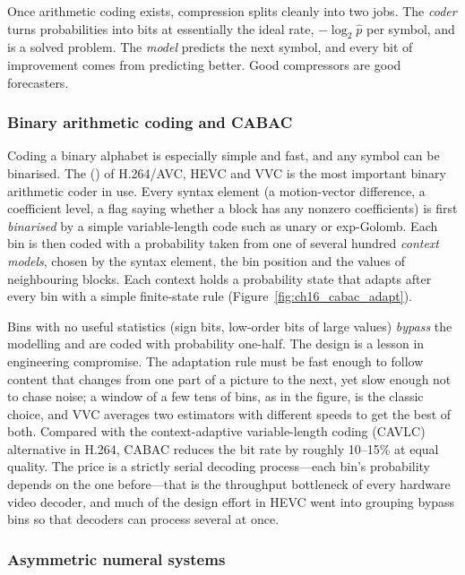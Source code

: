 \begin{keyidea}
Once arithmetic coding exists, compression splits cleanly into two jobs. The \emph{coder} turns
probabilities into bits at essentially the ideal rate, $-\log_2\hat p$ per symbol, and is a solved
problem. The \emph{model} predicts the next symbol, and every bit of improvement comes from
predicting better. Good compressors are good forecasters.
\end{keyidea}

\subsubsection{Binary arithmetic coding and CABAC}

Coding a binary alphabet is especially simple and fast, and any symbol can be binarised. The
 () of H.264/AVC, HEVC and VVC is the
most important binary arithmetic coder in use. Every syntax element (a motion-vector difference, a
coefficient level, a flag saying whether a block has any nonzero coefficients) is first
\emph{binarised} by a simple variable-length code such as unary or exp-Golomb. Each bin is then
coded with a probability taken from one of several hundred \emph{context models}, chosen by the
syntax element, the bin position and the values of neighbouring blocks. Each context holds a
probability state that adapts after every bin with a simple finite-state rule
(Figure~\ref{fig:ch16_cabac_adapt}).

Bins with no useful statistics (sign bits, low-order bits of large values) \emph{bypass} the
modelling and are coded with probability one-half. The design is a lesson in engineering
compromise. The adaptation rule must be fast enough to follow content that changes from one part
of a picture to the next, yet slow enough not to chase noise; a window of a few tens of bins, as in
the figure, is the classic choice, and VVC averages two estimators with different speeds to get the
best of both. Compared with the context-adaptive variable-length coding (CAVLC) alternative in
H.264, CABAC reduces the bit rate by roughly 10--15\% at equal quality. The price is a strictly
serial decoding process---each bin's probability depends on the one before---that is the throughput
bottleneck of every hardware video decoder, and much of the design effort in HEVC went into
grouping bypass bins so that decoders can process several at once.

\subsubsection{Asymmetric numeral systems}

